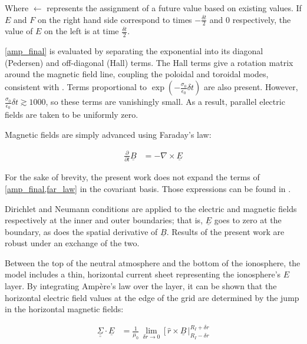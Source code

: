 \documentclass[draft,linenumbers]{agujournal}
\begin{document}
Where $\leftarrow$ represents the assignment of a future value based on existing values. If $E$ and $F$ on the right hand side correspond to times $-\frac{\delta \! t}{2}$ and $0$ respectively, the value of $E$ on the left is at time $\frac{\delta \! t}{2}$.

\cref{amp_final} is evaluated by separating the exponential into its diagonal (Pedersen) and off-diagonal (Hall) terms. The Hall terms give a rotation matrix around the magnetic field line, coupling the poloidal and toroidal modes, consistent with \citet{hughes_1974}. Terms proportional to $\exp \left( - \frac{\sigma_0}{\epsilon_0}\delta \! t \right)$ are also present. However, $\frac{\sigma_0}{\epsilon_0}\delta \! t \gtrsim 1000$, so these terms are vanishingly small. As a result, parallel electric fields are taken to be uniformly zero.

Magnetic fields are simply advanced using Faraday's law:
\begin{linenomath*}
\begin{align}
    \label{far_law}
    \frac{\partial}{\partial t} \underline{B} &= - \nabla \times \underline{E}
\end{align}
\end{linenomath*}

For the sake of brevity, the present work does not expand the terms of \cref{amp_final,far_law} in the covariant basis. Those expressions can be found in \citet{mceachern_2016}.


Dirichlet and Neumann conditions are applied to the electric and magnetic fields respectively at the inner and outer boundaries; that is, $\underline{E}$ goes to zero at the boundary, as does the spatial derivative of $\underline{B}$. Results of the present work are robust under an exchange of the two.

Between the top of the neutral atmosphere and the bottom of the ionosphere, the model includes a thin, horizontal current sheet representing the ionosphere's $E$ layer\citep{lysak_2004}. By integrating Amp\`ere's law over the layer, it can be shown\citep{fujita_1988} that the horizontal electric field values at the edge of the grid are determined by the jump in the horizontal magnetic fields:
\begin{linenomath*}
\begin{align}
  \label{jump_condition}
  \underline{\underline{\Sigma}} \cdot \underline{E} &= \frac{1}{\mu_0} \,
    \displaystyle\lim_{\delta \! r \rightarrow 0} \, \bigg[ \, \hat{r} \times \underline{B}
    \, \bigg|^{R_I + \delta \! r}_{R_I - \delta \! r}
\end{align}
\end{linenomath*}
\end{document}

